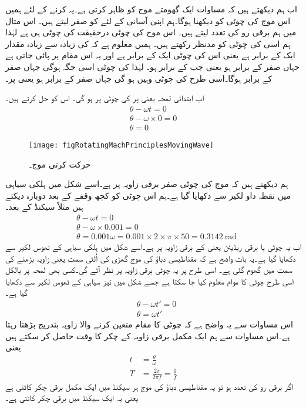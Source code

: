 اب ہم دیکھتے ہیں کہ مساوات  ایک گھومتے موج کو ظاہر کرتی ہے۔یہ کرنے کے لئے ہمیں اس موج کی چوٹی کو دیکھنا ہوگا۔ہم اپنی آسانی کے لئے   کو صفر لیتے ہیں۔ اس مثال میں ہم برقی رو کی تعدد   لیتے ہیں۔ اس موج کی چوٹی درحقیقت  کی چوٹی ہی ہے لہٰذا ہم اسی کی چوٹی کو مدنظر رکھتے ہیں۔ ہمیں معلوم ہے کہ  کی زیادہ سے زیادہ مقدار ایک کے برابر ہے یعنی اس کی چوٹی ایک کے برابر ہے اور یہ اس مقام پر پائی جاتی ہے جہاں  صفر کے برابر ہو یعنی جب  کے برابر ہو۔ لہٰذا  کی چوٹی اسی جگہ ہوگی جہاں  صفر کے برابر ہوگا۔اسی طرح  کی چوٹی وہیں ہو گی جہاں  صفر کے برابر ہو یعنی  پر۔

اب ابتدائی لمحہ  یعنی  پر  کی چوٹی  پر ہو گی۔ اس کو حل کرتے ہیں۔
\begin{align*}
\theta-\omega t =0\\
\theta -\omega \times 0=0\\
\theta =0
\end{align*}
%
\begin{figure}
\centering
\texttt{[image: figRotatingMachPrinciplesMovingWave]}
\caption{حرکت کرتی موج۔}
\label{شکل_گھومتے_مشین_حرکت_کرتی_موج}
\end{figure}
ہم دیکھتے ہیں کہ موج کی چوٹی صفر برقی زاویہ پر ہے۔اسے شکل  میں ہلکی سیاہی میں نقطہ داو لکیر سے دکھایا گیا ہے۔ہم اس چوٹی کو کچھ وقفے کے بعد دوبارہ دیکتے ہیں مثلاً  سیکنڈ کے بعد۔
\begin{align*}
&\theta-\omega t =0\\
&\theta -\omega \times 0.001=0\\
&\theta =0.001 \omega =0.001 \times 2 \times \pi \times 50=\SI{0.3142}{\radian} 
\end{align*}
اب یہ چوٹی  یا  برقی ریڈیئن یعنی  کے برقی زاویہ پر ہے۔اسے  شکل میں ہلکی سیاہی کے تھوس لکیر سے دکھایا گیا ہے۔یہ بات واضح ہے کہ مقناطیسی دباؤ کی موج گھڑی کی اُلٹی سمت یعنی زاویہ بڑھنے کی سمت میں گھوم گئی ہے۔ اسی طرح   پر یہ چوٹی  برقی زاویہ پر نظر آئے گی۔کسی بھی لمحہ  پر بالکل اسی طرح چوٹی کا موام معلوم کیا جا سکتا ہے جسے شکل میں تیز سیاہی کے ٹھوس لکیر سے دکھایا گیا ہے۔
\begin{align*}
&\theta-\omega t' =0\\
&\theta =\omega t'
\end{align*}
اس مساوات سے یہ واضح ہے کہ چوٹی کا مقام متعین کرنے والا زاویہ بتدریج بڑھتا رہتا ہے۔اس مساوات سے ہم ایک مکمل  برقی زاویہ کے چکر کا وقت  حاصل کر سکتے ہیں یعنی
\begin{align*}
t&=\frac{\theta}{\omega}\\
T&=\frac{2\pi}{2\pi f}=\frac{1}{f}
\end{align*}
اگر برقی رو کی تعدد  ہو تو یہ مقناطیسی دباؤ کی موج ہر  سیکنڈ میں ایک مکمل برقی چکر کاٹتی ہے یعنی یہ ایک سیکنڈ میں  برقی چکر کاٹتی ہے۔

